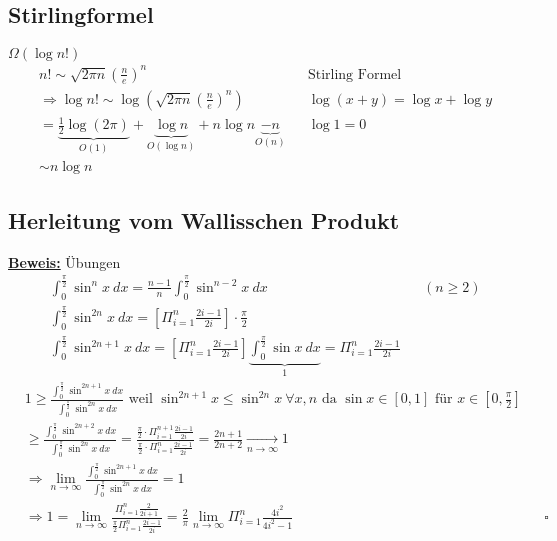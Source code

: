 \subsection{Stirlingformel}
$\Omega(\log n!)$\\

\begin{align*}
    &n! \sim \sqrt{2\pi n}(\frac{n}{e})^n &&\text{Stirling Formel}\\
    &\Rightarrow \log n! \sim \log(\sqrt{2\pi n}(\frac{n}{e})^n) && \log (x + y) = \log x + \log y\\
    &= \underbrace{\frac{1}{2}\log(2\pi)}_{O(1)} + \underbrace{\log n}_{O(\log n)} + n \log n \underbrace{- n}_{O(n)} && \log 1 = 0\\
    &\sim n \log n
\end{align*}


\subsection{Herleitung vom Wallisschen Produkt}
\underline{\textbf{Beweis:}} Übungen
\renewcommand{\intpihalbe}{\int_{0}^{\frac{\pi}{2}}}
\begin{align*}
    &\int_{0}^{\frac{\pi}{2}} \sin^{n} x\ dx = \frac{n-1}{n} \int_{0}^{\frac{\pi}{2}} \sin^{n -2} x \ dx && (n \geq 2)\\
    &\intpihalbe \sin^{2n} x \ dx = \left[\Pi_{i=1}^{n} \frac{2i -1}{2i}\right] \cdot \frac{\pi}{2}\\
    &\intpihalbe \sin^{2n+1} x \ dx = \left[\Pi_{i=1}^{n} \frac{2i -1}{2i}\right] \underbrace{\intpihalbe \sin x \ dx}_{1} = \Pi_{i=1}^{n} \frac{2i -1}{2i}
\end{align*}
\begin{align*}
    &1 \geq \frac{\intpihalbe \sin^{2n+1} x \ dx}{\intpihalbe \sin^{2n} x \ dx} \text{ weil } \sin^{2n+1} x \leq \sin^{2n} x \ \forall x, n \text{ da } \sin x \in [0, 1] \text{ für } x \in [0, \frac{\pi}{2}]\\
    &\geq \frac{\intpihalbe \sin^{2n+2} x \ dx}{\intpihalbe \sin^{2n} x \ dx} = \frac{\frac{\pi}{2} \cdot \Pi_{i = 1}^{n+1} \frac{2i-1}{2i}}{\frac{\pi}{2} \cdot \Pi_{i = 1}^{n} \frac{2i-1}{2i}} = \frac{2n +1}{2n+2} \underset{n \rightarrow \infty}{\longrightarrow} 1\\
    &\Rightarrow \lim_{n \rightarrow \infty} \frac{\intpihalbe \sin^{2n+1} x \ dx}{\intpihalbe \sin^{2n} x \ dx} = 1\\
    &\Rightarrow 1 = \lim_{n \rightarrow \infty} \frac{\Pi_{i = 1}^{n} \frac{2}{2i+1}}{\frac{\pi}{2} \Pi_{i = 1}^{n} \frac{2i-1}{2i}} = \frac{2}{\pi} \lim_{n \rightarrow \infty} \Pi_{i = 1}^{n} \frac{4i^2}{4i^2 -1} && \square
\end{align*}
\newpage
